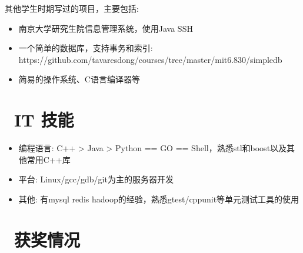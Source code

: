 \documentclass{resume}
\begin{document}
其他学生时期写过的项目，主要包括:
\begin{itemize}
  \item 南京大学研究生院信息管理系统，使用Java SSH
  \item 一个简单的数据库，支持事务和索引: https://github.com/tavaresdong/courses/tree/master/mit6.830/simpledb
  \item 简易的操作系统、C语言编译器等
\end{itemize}

\section{\faCogs\ IT 技能}
\begin{itemize}[parsep=0.5ex]
  \item 编程语言: C++ > Java > Python == GO == Shell，熟悉stl和boost以及其他常用C++库
  \item 平台: Linux/gcc/gdb/git为主的服务器开发
  \item 其他: 有mysql redis hadoop的经验，熟悉gtest/cppunit等单元测试工具的使用
\end{itemize}

\section{\faHeartO\ 获奖情况}
\end{document}
